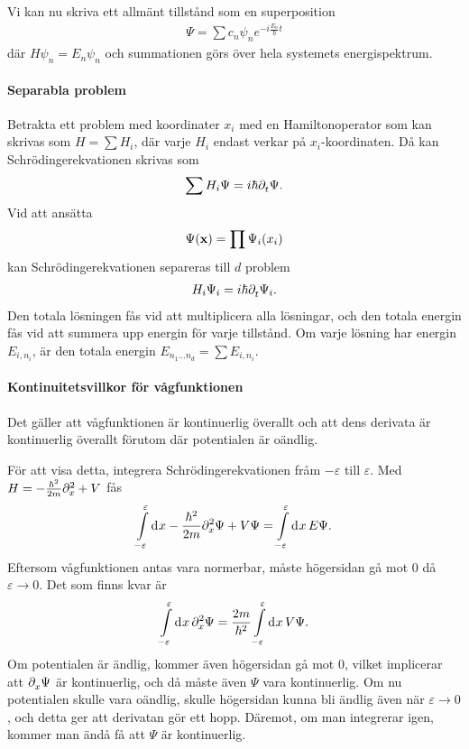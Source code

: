 Vi kan nu skriva ett allmänt tillstånd som en superposition
\begin{align*}
	\Psi = \sum c_{n}\psi_{n}e^{-i\frac{E_{n}}{\hbar}t}
\end{align*}
där $H\psi_{n} = E_{n}\psi_{n}$ och summationen görs över hela systemets energispektrum.

\paragraph{Separabla problem}
Betrakta ett problem med koordinater $x_{i}$ med en Hamiltonoperator som kan skrivas som $H = \sum H_{i}$, där varje $H_{i}$ endast verkar på $x_{i}$-koordinaten. Då kan Schrödingerekvationen skrivas som
\begin{align*}
	\sum H_{i}\Psi = i\hbar\del{t}{\Psi}.
\end{align*}
Vid att ansätta
\begin{align*}
	\Psi(\vb{x}) = \prod \Psi_{i}(x_{i})
\end{align*}
kan Schrödingerekvationen separeras till $d$ problem
\begin{align*}
	H_{i}\Psi_{i} = i\hbar\del{t}{\Psi_{i}}.
\end{align*}
Den totala lösningen fås vid att multiplicera alla lösningar, och den totala energin fås vid att summera upp energin för varje tillstånd. Om varje lösning har energin $E_{i, n_{i}}$, är den totala energin $E_{n_{1}\dots n_{d}} = \sum E_{i, n_{i}}$.

\paragraph{Kontinuitetsvillkor för vågfunktionen}
Det gäller att vågfunktionen är kontinuerlig överallt och att dens derivata är kontinuerlig överallt förutom där potentialen är oändlig.

För att visa detta, integrera Schrödingerekvationen fråm $-\varepsilon$ till $\varepsilon$. Med $H = -\frac{\hbar^{2}}{2m}\del[2]{x}{} + V$ fås
\begin{align*}
	\integ{-\varepsilon}{\varepsilon}{x}{-\frac{\hbar^{2}}{2m}\del[2]{x}{\Psi} + V\Psi} = \integ{-\varepsilon}{\varepsilon}{x}{E\Psi}.
\end{align*}
Eftersom vågfunktionen antas vara normerbar, måste högersidan gå mot $0$ då $\varepsilon\to 0$. Det som finns kvar är
\begin{align*}
	\integ{-\varepsilon}{\varepsilon}{x}{\del[2]{x}{\Psi}} = \frac{2m}{\hbar^{2}}\integ{-\varepsilon}{\varepsilon}{x}{V\Psi}.
\end{align*}
Om potentialen är ändlig, kommer även högersidan gå mot $0$, vilket implicerar att $\del{x}{\Psi}$ är kontinuerlig, och då måste även $\Psi$ vara kontinuerlig. Om nu potentialen skulle vara oändlig, skulle högersidan kunna bli ändlig även när $\varepsilon\to 0$, och detta ger att derivatan gör ett hopp. Däremot, om man integrerar igen, kommer man ändå få att $\Psi$ är kontinuerlig.

